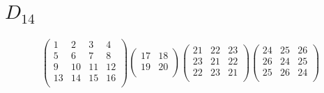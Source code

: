 \documentclass[12pt,a4paper]{amsart}
\begin{document}
\section*{$D_{14}$}
\begin{align*}
\left(\begin{array}{r|r|r|r}%
1&2&3&4\\%
\hline
5&6&7&8\\%
\hline
9&10&11&12\\%
\hline
13&14&15&16\\%
\end{array}\right)%
\left(\begin{array}{r|r}%
17&18\\%
\hline
19&20\\%
\end{array}\right)%
\left(\begin{array}{rrr}%
21&22&23\\
23&21&22\\
22&23&21\\
\end{array}\right)%
\left(\begin{array}{rrr}%
24&25&26\\
26&24&25\\
25&26&24\\
\end{array}\right)%
\end{align*}
\end{document}
